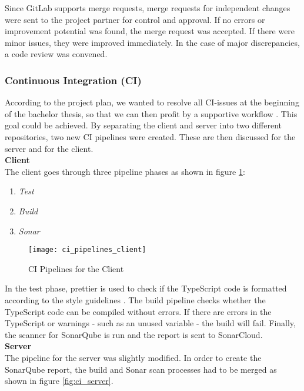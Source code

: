 Since GitLab supports merge requests,
merge requests for independent changes were sent to the project partner for control and approval.
If no errors or improvement potential was found, the merge request was accepted.
If there were minor issues, they were improved immediately.
In the case of major discrepancies, a code review was convened.

\subsubsection{Continuous Integration (CI)}
According to the project plan,
we wanted to resolve all CI-issues at the beginning of the bachelor thesis,
so that we can then profit by a supportive workflow \cite{projectplan}. 
This goal could be achieved.
By separating the client and server into two different repositories, two new CI pipelines were created.
These are then discussed for the server and for the client. \\

{\bf Client}\\
The client goes through three pipeline phases as shown in figure \ref{fig:ci_client}:
\begin{enumerate}
    \item \textit{Test}
    \item \textit{Build}
    \item \textit{Sonar}
\end{enumerate}

\begin{figure}[H]
    \centering
    \texttt{[image: ci\_pipelines\_client]}
    \caption{CI Pipelines for the Client}
    \label{fig:ci_client}
\end{figure}

In the test phase, prettier \cite{dev} is used to check if the TypeScript code
is formatted according to the style guidelines \cite{projectplan}.
The build pipeline checks whether the TypeScript code can be compiled without errors.
If there are errors in the TypeScript or warnings - such as an unused variable - the build will fail.
Finally, the scanner for SonarQube is run and the report is sent to SonarCloud. \\

{\bf Server}\\
The pipeline for the server was slightly modified.
In order to create the SonarQube report, the build and Sonar scan processes had to be merged
as shown in figure \ref{fig:ci_server}.

